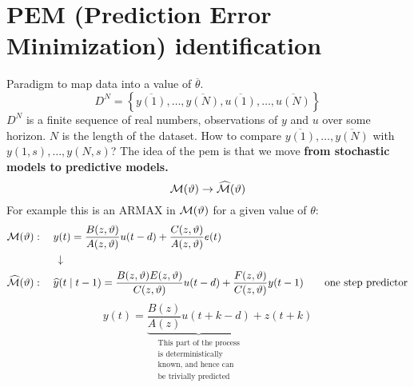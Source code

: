 \section{PEM (Prediction Error Minimization) identification}

Paradigm to map data into a value of $\overline{\theta}$.
$$
	D^N=\left\{\overline{y(1)},\ldots,\overline{y(N)},\overline{u(1)},\ldots,\overline{u(N)}\right\}
$$
$D^N$ is a finite sequence of real numbers, observations of $y$ and $u$ over some horizon. $N$ is the length of the dataset.
How to compare $\overline{y(1)},\ldots,\overline{y(N)}$ with $y(1,s),\ldots,y(N,s)$?
The idea of the \gls{pem} is that we move \textbf{from stochastic models to predictive models.}
\[
	\mathcal{M}(\vartheta) \to \widehat{\mathcal{M}}(\vartheta)
\]
For example this is an ARMAX in $\mathcal{M}(\vartheta)$ for a given value of $\theta$:
\begin{align*}
	\mathcal{M}(\vartheta)&:\quad y(t)=\frac{B(z, \vartheta)}{A(z, \vartheta)} u(t-d)+\frac{C(z, \vartheta)}{A(z, \vartheta)} e(t)\\
	&\qquad\downarrow\\
	\widehat{\mathcal{M}}(\vartheta)&: \quad \widehat{y}(t \mid t-1) =\frac{B(z,\vartheta) E(z,\vartheta)}{C(z,\vartheta)} u(t-d)+\frac{F(z,\vartheta)}{C(z,\vartheta)} y(t-1) \qquad \text{one step predictor}
\end{align*}
$$y(t)=\underbrace{\frac{B(z)}{A(z)} u(t+k-d)}_{\substack{\text{This part of the process}\\ 
		\text{is deterministically}\\
		\text{known, and hence can}\\
		\text{be trivially predicted}}} +z(t+k)$$